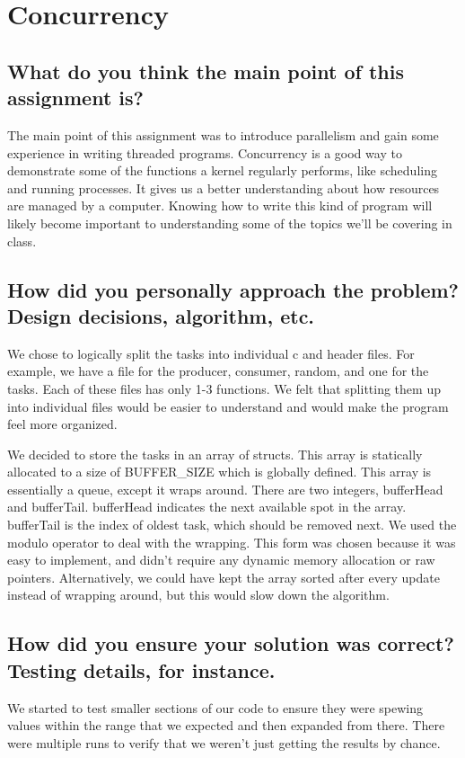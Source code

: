 \documentclass[onecolumn, draftclsnofoot,10pt, compsoc]{IEEEtran}
\begin{document}
\section{Concurrency}
\subsection{What do you think the main point of this assignment is?}
The main point of this assignment was to introduce parallelism and gain some experience in writing threaded programs. 
Concurrency is a good way to demonstrate some of the functions a kernel regularly performs, like scheduling and running processes. It gives us a better understanding about how resources are managed by a computer. 
Knowing how to write this kind of program will likely become important to understanding some of the topics we'll be covering in class.

\subsection{How did you personally approach the problem? Design decisions, algorithm, etc.}
We chose to logically split the tasks into individual c and header files. For example, we have a file for the producer, consumer, random, and one for the tasks. Each of these files has only 1-3 functions. We felt that splitting them up into individual files would be easier to understand and would make the program feel more organized. 

We decided to store the tasks in an array of structs. This array is statically allocated to a size of BUFFER\_SIZE which is globally defined. This array is essentially a queue, except it wraps around. There are two integers, bufferHead and bufferTail. bufferHead indicates the next available spot in the array. bufferTail is the index of oldest task, which should be removed next. We used the modulo operator to deal with the wrapping. This form was chosen because it was easy to implement, and didn't require any dynamic memory allocation or raw pointers. Alternatively, we could have kept the array sorted after every update instead of wrapping around, but this would slow down the algorithm. 


\subsection{How did you ensure your solution was correct? Testing details, for instance.}
We started to test smaller sections of our code to ensure they were spewing values within the range that we expected and then expanded from there. There were multiple runs to verify that we weren't just getting the results by chance.
\end{document}
